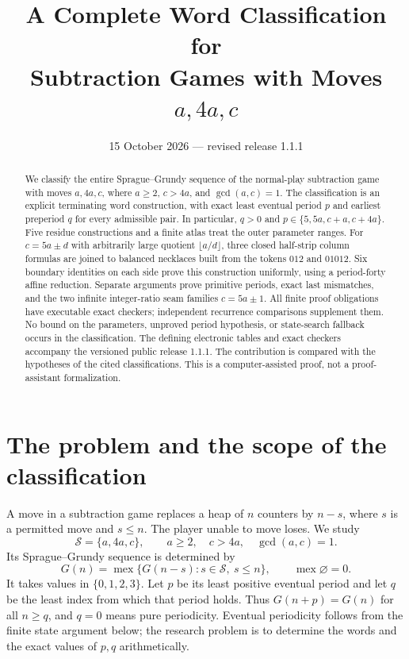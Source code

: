 \documentclass[11pt]{article}
\title{A Complete Word Classification for\texorpdfstring{\\}{ }Subtraction Games with Moves $a,4a,c$}
\author{}
\date{15 October 2026 --- revised release 1.1.1}
\theoremstyle{remark}\newtheorem{remark}[theorem]{Remark}
\DeclareMathOperator{\mex}{mex}
\begin{document}
\maketitle
\begin{abstract}
We classify the entire Sprague--Grundy sequence of the normal-play subtraction game with moves $a,4a,c$, where $a\ge2$, $c>4a$, and $\gcd(a,c)=1$. The classification is an explicit terminating word construction, with exact least eventual period $p$ and earliest preperiod $q$ for every admissible pair. In particular, $q>0$ and $p\in\{5,5a,c+a,c+4a\}$. Five residue constructions and a finite atlas treat the outer parameter ranges. For $c=5a\pm d$ with arbitrarily large quotient $\lfloor a/d\rfloor$, three closed half-strip column formulas are joined to balanced necklaces built from the tokens $012$ and $01012$. Six boundary identities on each side prove this construction uniformly, using a period-forty affine reduction. Separate arguments prove primitive periods, exact last mismatches, and the two infinite integer-ratio seam families $c=5a\pm1$. All finite proof obligations have executable exact checkers; independent recurrence comparisons supplement them. No bound on the parameters, unproved period hypothesis, or state-search fallback occurs in the classification. The defining electronic tables and exact checkers accompany the versioned public release 1.1.1. The contribution is compared with the hypotheses of the cited classifications. This is a computer-assisted proof, not a proof-assistant formalization.
\end{abstract}
\clearpage
{\small\tableofcontents}
\clearpage



\section{The problem and the scope of the classification}
A move in a subtraction game replaces a heap of $n$ counters by $n-s$, where $s$ is a permitted move and $s\le n$. The player unable to move loses. We study
\[
\mathcal S=\{a,4a,c\},\qquad a\ge2,\quad c>4a,\quad \gcd(a,c)=1.
\]
Its Sprague--Grundy sequence is determined by
\begin{equation}\label{eq:sg}
G(n)=\mex\{G(n-s):s\in\mathcal S,\ s\le n\},\qquad \mex\varnothing=0.
\end{equation}
It takes values in $\{0,1,2,3\}$. Let $p$ be its least positive eventual period and let $q$ be the least index from which that period holds. Thus $G(n+p)=G(n)$ for all $n\ge q$, and $q=0$ means pure periodicity. Eventual periodicity follows from the finite state argument below; the research problem is to determine the words and the exact values of $p,q$ arithmetically.
\end{document}
